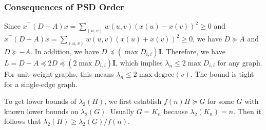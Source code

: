 \subsubsection{Consequences of PSD Order}

Since $x^\top (D-A) x = \sum_{(u,v)} w(u,v)(x(u)-x(v))^2 \ge 0$ and $x^\top (D+A) x = \sum_{(u,v)} w(u,v)(x(u)+x(v))^2 \ge 0$, we have $D \succeq A$ and $D \succeq -A$. In addition, we have $D \preceq (\max D_{i,i}) \boldsymbol{I}$. Therefore, we have $L = D-A \preceq 2D \preceq (2\max D_{i,i}) \boldsymbol{I}$, which implies $\lambda_n \le 2\max D_{i,i}$ for any graph. For unit-weight graphs, this means $\lambda_n \le 2 \max \text{degree}(v)$. The bound is tight for a single-edge graph.

To get lower bounds of $\lambda_2(H)$, we first establish $f(n) H \succeq G$ for some $G$ with known lower bounds on $\lambda_2(G)$. Usually $G=K_n$ because $\lambda_2(K_n) = n$. Then it follows that $\lambda_2(H) \ge \lambda_2(G)/f(n)$.

